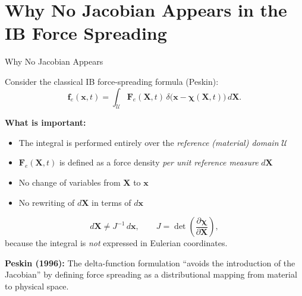 \documentclass{beamer}
\begin{document}
\section{Why No Jacobian Appears in the IB Force Spreading}

\begin{frame}{Why No Jacobian Appears}
\small

Consider the classical IB force-spreading formula (Peskin):
\[
\mathbf{f}_e(\mathbf{x},t)
=
\int_{\mathcal{U}}
\mathbf{F}_e(\mathbf{X},t)\,
\delta\!\big(\mathbf{x}-\boldsymbol{\chi}(\mathbf{X},t)\big)\,d\mathbf{X}.
\]

\medskip

\textbf{What is important:}
\begin{itemize}
    \item The integral is performed entirely over the \emph{reference (material) domain} $\mathcal{U}$
    \item $\mathbf{F}_e(\mathbf{X},t)$ is defined as a force density \emph{per unit reference measure} $d\mathbf{X}$
    \item No change of variables from $\mathbf{X}$ to $\mathbf{x}$
    \item No rewriting of $d\mathbf{X}$ in terms of $d\mathbf{x}$
\end{itemize}

\[
d\mathbf{X} \neq J^{-1}\,d\mathbf{x},
\qquad
J = \det\!\left(\frac{\partial\boldsymbol{\chi}}{\partial\mathbf{X}}\right),
\]
because the integral is \emph{not} expressed in Eulerian coordinates.

\medskip

\textbf{Peskin (1996):}
The delta-function formulation ``avoids the introduction of the Jacobian'' by defining force spreading as a distributional mapping from material to physical space.

\end{frame}

\end{document}
